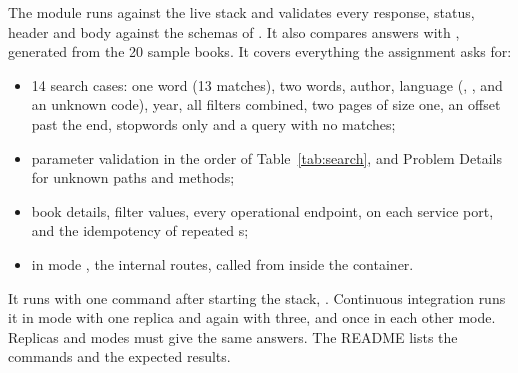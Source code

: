 The  module runs against the live stack and validates every response, status, header and body against
the schemas of . It also compares answers with , generated from the
20 sample books. It covers everything the assignment asks for:
\begin{itemize}
\item 14 search cases: one word (13 matches), two words, author, language (, ,  and an
  unknown code), year, all filters combined, two pages of size one, an offset past the end, stopwords only and a query
  with no matches;
\item parameter validation in the order of Table~\ref{tab:search}, and Problem Details for unknown paths and methods;
\item book details, filter values, every operational endpoint,  on each service port, and the
  idempotency of repeated s;
\item in mode , the internal routes, called from inside the  container.
\end{itemize}
It runs with one command after starting the stack, .
Continuous integration runs it in mode  with one  replica and again with three, and once in
each other mode. Replicas and modes must give the same answers. The README lists the commands and the expected
results.

